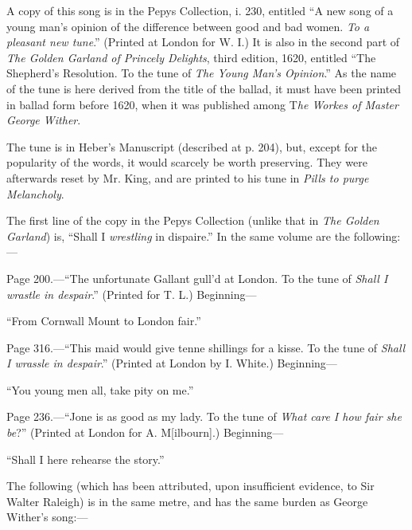 
A copy of this song is in the Pepys Collection, i. 230, entitled “A new song of
a young man’s opinion of the difference between good and bad women. \textit{To a
pleasant new tune}.” (Printed at London for W. I.) It is also in the second part
of \textit{The Golden Garland of Princely Delights}, third edition, 1620, entitled “The
Shepherd’s Resolution. To the tune of \textit{The Young Man's Opinion}.” As the
name of the tune is here derived from the title of the ballad, it must have been
printed in ballad form before 1620, when it was published among T\textit{he Workes of
Master George Wither}.

The tune is in Heber’s Manuscript (described at p. 204), but, except for the
popularity of the words, it would scarcely be worth preserving. They were afterwards
reset by Mr. King, and are printed to his tune in \textit{ Pills to purge Melancholy}.

The first line of the copy in the Pepys Collection (unlike that in \textit{The Golden
Garland}) is, “Shall I \textit{wrestling} in dispaire.” In the same volume are the
following:—

Page 200.—“The unfortunate Gallant gull’d at London. To the tune of
\textit{Shall I wrastle in despair}.” (Printed for T. L.) Beginning—
\settowidth{\versewidth}{“From Cornwall Mount to London fair.”}
\begin{scverse}
“From Cornwall Mount to London fair.”
\end{scverse}

Page 316.—“This maid would give tenne shillings for a kisse. To the tune
of \textit{Shall I wrassle in despair}.” (Printed at London by I. White.) Beginning—
\begin{scverse}
“You young men all, take pity on me.”
\end{scverse}

Page 236.—“Jone is as good as my lady. To the tune of \textit{What care I how
fair she be}?” (Printed at London for A. M[ilbourn].) Beginning—
\begin{scverse}
“Shall I here rehearse the story.”
\end{scverse}

The following (which has been attributed, upon insufficient evidence, to Sir
Walter Raleigh) is in the same metre, and has the same burden as George
Wither’s song:—

